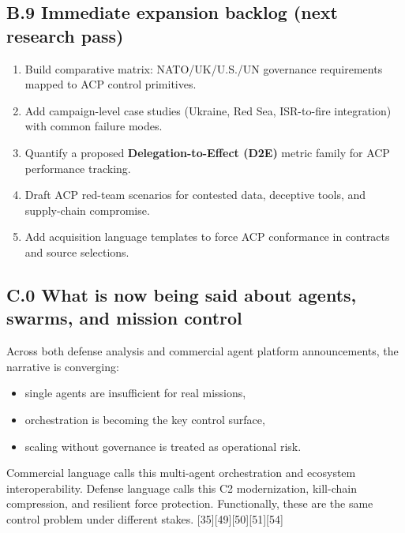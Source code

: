 \documentclass[
]{article}
\providecommand{\tightlist}{%
  \setlength{\itemsep}{0pt}\setlength{\parskip}{0pt}}
\begin{document}
\hypertarget{b.9-immediate-expansion-backlog-next-research-pass}{%
\subsection{B.9 Immediate expansion backlog (next research
pass)}\label{b.9-immediate-expansion-backlog-next-research-pass}}

\begin{enumerate}
\def\labelenumi{\arabic{enumi}.}
\tightlist
\item
  Build comparative matrix: NATO/UK/U.S./UN governance requirements
  mapped to ACP control primitives.
\item
  Add campaign-level case studies (Ukraine, Red Sea, ISR-to-fire
  integration) with common failure modes.
\item
  Quantify a proposed \textbf{Delegation-to-Effect (D2E)} metric family
  for ACP performance tracking.
\item
  Draft ACP red-team scenarios for contested data, deceptive tools, and
  supply-chain compromise.
\item
  Add acquisition language templates to force ACP conformance in
  contracts and source selections.
\end{enumerate}

\hypertarget{c.0-what-is-now-being-said-about-agents-swarms-and-mission-control}{%
\subsection{C.0 What is now being said about agents, swarms, and mission
control}\label{c.0-what-is-now-being-said-about-agents-swarms-and-mission-control}}

Across both defense analysis and commercial agent platform
announcements, the narrative is converging:

\begin{itemize}
\tightlist
\item
  single agents are insufficient for real missions,
\item
  orchestration is becoming the key control surface,
\item
  scaling without governance is treated as operational risk.
\end{itemize}

Commercial language calls this multi-agent orchestration and ecosystem
interoperability. Defense language calls this C2 modernization,
kill-chain compression, and resilient force protection. Functionally,
these are the same control problem under different stakes.
{[}35{]}{[}49{]}{[}50{]}{[}51{]}{[}54{]}
\end{document}
